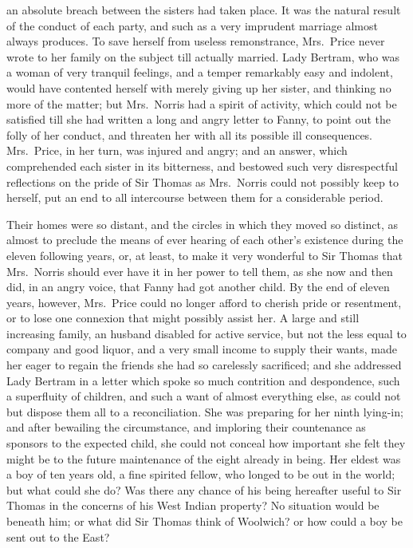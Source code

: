 an absolute breach between the sisters had taken place.
It was the natural result of the conduct of each party,
and such as a very imprudent marriage almost always produces.
To save herself from useless remonstrance, Mrs.\ Price never
wrote to her family on the subject till actually married.
Lady Bertram, who was a woman of very tranquil feelings,
and a temper remarkably easy and indolent, would have
contented herself with merely giving up her sister,
and thinking no more of the matter; but Mrs.\ Norris
had a spirit of activity, which could not be satisfied
till she had written a long and angry letter to Fanny,
to point out the folly of her conduct, and threaten
her with all its possible ill consequences.  Mrs.\ Price,
in her turn, was injured and angry; and an answer,
which comprehended each sister in its bitterness, and bestowed
such very disrespectful reflections on the pride of Sir
Thomas as Mrs.\ Norris could not possibly keep to herself,
put an end to all intercourse between them for a considerable
period.

Their homes were so distant, and the circles in which they
moved so distinct, as almost to preclude the means of ever
hearing of each other's existence during the eleven
following years, or, at least, to make it very wonderful
to Sir Thomas that Mrs.\ Norris should ever have it
in her power to tell them, as she now and then did,
in an angry voice, that Fanny had got another child.
By the end of eleven years, however, Mrs.\ Price could no
longer afford to cherish pride or resentment, or to lose one
connexion that might possibly assist her.  A large and still
increasing family, an husband disabled for active service,
but not the less equal to company and good liquor, and a
very small income to supply their wants, made her eager
to regain the friends she had so carelessly sacrificed;
and she addressed Lady Bertram in a letter which spoke
so much contrition and despondence, such a superfluity
of children, and such a want of almost everything else,
as could not but dispose them all to a reconciliation.
She was preparing for her ninth lying-in; and after
bewailing the circumstance, and imploring their countenance
as sponsors to the expected child, she could not conceal
how important she felt they might be to the future
maintenance of the eight already in being.  Her eldest
was a boy of ten years old, a fine spirited fellow,
who longed to be out in the world; but what could she do?
Was there any chance of his being hereafter useful to Sir
Thomas in the concerns of his West Indian property?
No situation would be beneath him; or what did Sir Thomas
think of Woolwich? or how could a boy be sent out to
the East?

